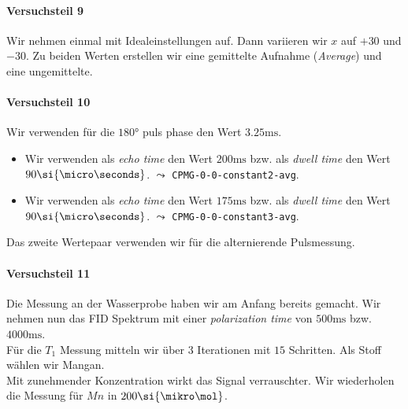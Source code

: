 \documentclass{subfiles}
\begin{document}
        \paragraph*{Versuchsteil 9}
            Wir nehmen einmal mit Idealeinstellungen auf. Dann variieren wir $x$ auf $+30$ und $-30$. Zu beiden Werten erstellen wir eine gemittelte Aufnahme (\emph{Average}) und eine ungemittelte.


        \paragraph*{Versuchsteil 10}
            Wir verwenden für die $180\si{\degree}$ puls phase den Wert $3.25\si{\ms}$. 
            \begin{itemize}
                \item Wir verwenden als \emph{echo time} den Wert $200\si{\ms}$ bzw. als \emph{dwell time} den Wert $90\si{\micro\seconds}$. $\leadsto$ \texttt{CPMG-0-0-constant2-avg}.
                \item Wir verwenden als \emph{echo time} den Wert $175\si{\ms}$ bzw. als \emph{dwell time} den Wert $90\si{\micro\seconds}$. $\leadsto$ \texttt{CPMG-0-0-constant3-avg}.
            \end{itemize}
            Das zweite Wertepaar verwenden wir für die alternierende Pulsmessung. 

        \paragraph*{Versuchsteil 11}
            Die Messung an der Wasserprobe haben wir am Anfang bereits gemacht. Wir nehmen nun das FID Spektrum mit einer \emph{polarization time} von $500\si{\ms}$ bzw. $4000\si{\ms}$. \\

            Für die $T_1$ Messung mitteln wir über $3$ Iterationen mit $15$ Schritten. Als Stoff wählen wir Mangan. \\

            Mit zunehmender Konzentration wirkt das Signal verrauschter. Wir wiederholen die Messung für $Mn$ in $200\si{\mikro\mol}$. \\
            
\end{document}
